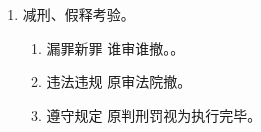 \begin{enumerate}
\begin{enumerate}
\begin{enumerate}
\begin{enumerate}
                          \item 特别假释 \yjt 最高法。。
                          \item 合议庭、书面（提讯）、审期 1 个月。。
                          \item 同级检收到假释裁定书副本 20 日内未提出书面纠正意见的，方可生效。
                        \end{enumerate}
                        \begin{kk}{一定要开庭的}
                          \begin{enumerate}
                            \item 重大立功不一般；重大影响有意见；有权有势又有钱。
                            \item 职务、黑、金。职务、黑社会性质、金融类犯罪。。
                            \item 应当通知检、罪犯、执行机关出庭。
                                  \begin{itemize}
                                    \item {}！！
                                    \item {}。
                                  \end{itemize}
                            \item 开庭地点。执行场所 \hz 法院确定的场所。。
                          \end{enumerate}
                        \end{kk}
                  \item 减刑、假释考验。
                        \begin{enumerate}
                          \item 漏罪新罪 \yjt 谁审谁撤。。
                          \item 违法违规 \yjt 原审法院撤。
                          \item 遵守规定 \yjt 原判刑罚视为执行完毕。
                        \end{enumerate}
                \end{enumerate}
        \end{enumerate}
\end{enumerate}
